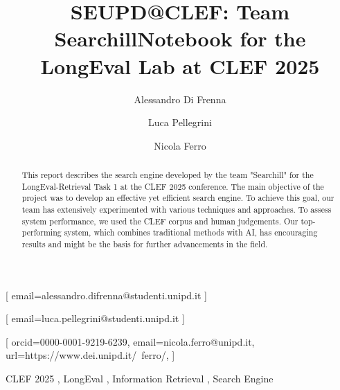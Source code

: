 \documentclass{ceurart}
\begin{document}


\title{SEUPD@CLEF: Team Searchill}

\title[mode=sub]{Notebook for the LongEval Lab at CLEF 2025}

\author[1]{Alessandro Di Frenna}[%
email=alessandro.difrenna@studenti.unipd.it
]

\author[1]{Luca Pellegrini}[%
email=luca.pellegrini@studenti.unipd.it
]

\author[1]{Nicola Ferro}[%
orcid=0000-0001-9219-6239,
email=nicola.ferro@unipd.it,
url=https://www.dei.unipd.it/~ferro/,
]


\address[1]{University of Padua, Italy}


\begin{abstract}
  This report describes the search engine developed by the team "Searchill" for the LongEval-Retrieval Task 1 at the CLEF 2025 conference. The main objective of the project was to develop an effective yet efficient search engine. To achieve this goal, our team has extensively experimented with various techniques and approaches. To assess system performance, we used the CLEF corpus and human judgements. 
  Our top-performing system, which combines traditional methods with AI, has encouraging results and might be the basis for further advancements in the field.
\end{abstract}

\begin{keywords}
  CLEF 2025 \sep
  LongEval \sep
  Information Retrieval \sep
  Search Engine
\end{keywords}

\maketitle












\end{document}
